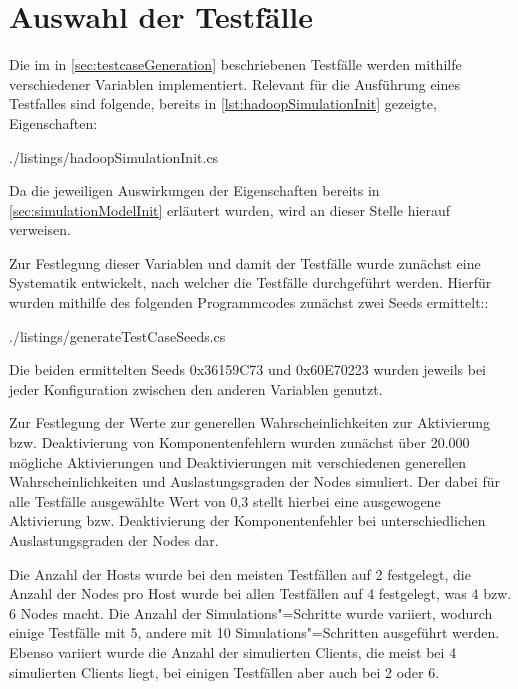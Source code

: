 \section{Auswahl der Testfälle}
\label{sec:selectTestcases}

Die im in \autoref{sec:testcaseGeneration} beschriebenen Testfälle werden mithilfe verschiedener Variablen implementiert.
Relevant für die Ausführung eines Testfalles sind folgende, bereits in \autoref{lst:hadoopSimulationInit} gezeigte, Eigenschaften:


{./listings/hadoopSimulationInit.cs}

Da die jeweiligen Auswirkungen der Eigenschaften bereits in \autoref{sec:simulationModelInit} erläutert wurden, wird an dieser Stelle hierauf verweisen.

Zur Festlegung dieser Variablen und damit der Testfälle wurde zunächst eine Systematik entwickelt, nach welcher die Testfälle durchgeführt werden.
Hierfür wurden mithilfe des folgenden Programmcodes zunächst zwei Seeds ermittelt::


{./listings/generateTestCaseSeeds.cs}

Die beiden ermittelten Seeds 0x36159C73 und 0x60E70223 wurden jeweils bei jeder Konfiguration zwischen den anderen Variablen genutzt.

Zur Festlegung der Werte zur generellen Wahrscheinlichkeiten zur Aktivierung bzw. Deaktivierung von Komponentenfehlern wurden zunächst über 20.000 mögliche Aktivierungen und Deaktivierungen mit verschiedenen generellen Wahrscheinlichkeiten und Auslastungsgraden der Nodes simuliert.
Der dabei für alle Testfälle ausgewählte Wert von 0,3 stellt hierbei eine ausgewogene Aktivierung bzw. Deaktivierung der Komponentenfehler bei unterschiedlichen Auslastungsgraden der Nodes dar.

Die Anzahl der Hosts wurde bei den meisten Testfällen auf 2 festgelegt, die Anzahl der Nodes pro Host wurde bei allen Testfällen auf 4 festgelegt, was 4 bzw. 6 Nodes macht.
Die Anzahl der Simulations"=Schritte wurde variiert, wodurch einige Testfälle mit 5, andere mit 10 Simulations"=Schritten ausgeführt werden.
Ebenso variiert wurde die Anzahl der simulierten Clients, die meist bei 4 simulierten Clients liegt, bei einigen Testfällen aber auch bei 2 oder 6.

